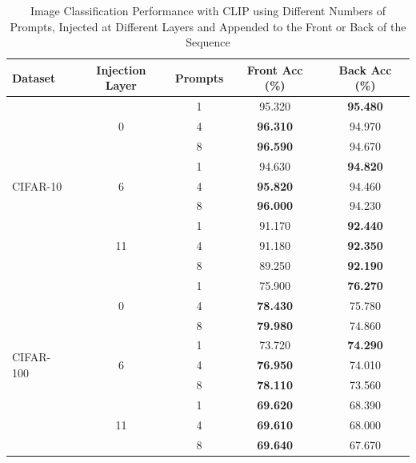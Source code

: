 \documentclass[a4paper]{article}
\begin{document}
\begin{table}[h]
    \centering
    \begin{tabular}{|l|c|c|c|c|}
    \hline
    \rowcolor{Gray}
    \textbf{Dataset} & \textbf{Injection Layer} & \textbf{Prompts} & \textbf{Front Acc (\%)} & \textbf{Back Acc (\%)} \\ \hline
    \multirow{9}{*}{CIFAR-10}  
                               & \multirow{3}{*}{0} & 1 & 95.320 & \textbf{95.480} \\ \cline{3-5}
                               &                     & 4 & \textbf{96.310} & 94.970 \\ \cline{3-5}
                               &                     & 8 & \textbf{96.590} & 94.670 \\ \cline{2-5}
                               & \multirow{3}{*}{6} & 1 & 94.630  & \textbf{94.820} \\ \cline{3-5}
                               &                     & 4 & \textbf{95.820} & 94.460 \\ \cline{3-5}
                               &                     & 8 & \textbf{96.000} & 94.230 \\ \cline{2-5}
                               & \multirow{3}{*}{11}& 1 & 91.170  & \textbf{92.440} \\ \cline{3-5}
                               &                     & 4 & 91.180  & \textbf{92.350} \\ \cline{3-5}
                               &                     & 8 & 89.250  & \textbf{92.190} \\ \hline
    \multirow{9}{*}{CIFAR-100} 
                               & \multirow{3}{*}{0} & 1 & 75.900  & \textbf{76.270} \\ \cline{3-5}
                               &                     & 4 & \textbf{78.430} & 75.780 \\ \cline{3-5}
                               &                     & 8 & \textbf{79.980} & 74.860 \\ \cline{2-5}
                               & \multirow{3}{*}{6} & 1 & 73.720  & \textbf{74.290} \\ \cline{3-5}
                               &                     & 4 & \textbf{76.950} & 74.010 \\ \cline{3-5}
                               &                     & 8 & \textbf{78.110} & 73.560 \\ \cline{2-5}
                               & \multirow{3}{*}{11}& 1 & \textbf{69.620} & 68.390 \\ \cline{3-5}
                               &                     & 4 & \textbf{69.610} & 68.000 \\ \cline{3-5}
                               &                     & 8 & \textbf{69.640} & 67.670 \\ \hline
    \end{tabular}
    \caption{Image Classification Performance with CLIP using Different Numbers of Prompts, Injected at Different Layers and Appended to the Front or Back of the Sequence}
    \label{tab:clip_accuracy_deep_prompts}
\end{table}
\end{document}
